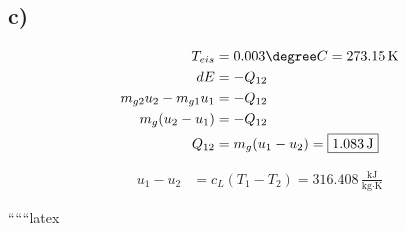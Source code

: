 

\subsection*{c)}

\begin{align*}
    T_{eis} &= 0.003 \degree C = 273.15 \, \text{K} \\
    dE &= -Q_{12} \\
    m_{g2} u_2 - m_{g1} u_1 &= -Q_{12} \\
    m_{g} (u_2 - u_1) &= -Q_{12} \\
    Q_{12} &= m_{g} (u_1 - u_2) = \boxed{1.083 \, \text{J}}
\end{align*}

\begin{align*}
    u_1 - u_2 &= c_{L} (T_1 - T_2) = \boxed{316.408 \, \frac{\text{kJ}}{\text{kg} \cdot \text{K}}}
\end{align*}

``````latex